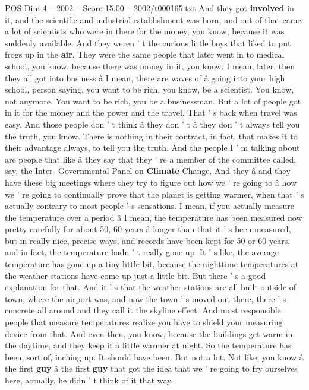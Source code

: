 \begin{textsample}{POS Dim 4 – 2002 – Score 15.00 – 2002/t000165.txt}
And they got \textbf{involved} in it, and the scientific and industrial establishment was born, and out of that came a lot of scientists who were in there for the money, you know, because it was suddenly available.
And they weren ' t the curious little boys that liked to put frogs up in the \textbf{air}.
They were the same people that later went in to medical school, you know, because there was money in it, you know.
I mean, later, then they all got into business â I mean, there are waves of â going into your high school, person saying, you want to be rich, you know, be a scientist.
You know, not anymore.
You want to be rich, you be a businessman.
But a lot of people got in it for the money and the power and the travel.
That ' s back when travel was easy.
And those people don ' t think â they don ' t â they don ' t always tell you the truth, you know.
There is nothing in their contract, in fact, that makes it to their advantage always, to tell you the truth.
And the people I ' m talking about are people that like â they say that they ' re a member of the committee called, say, the Inter- Governmental Panel on \textbf{Climate} Change.
And they â and they have these big meetings where they try to figure out how we ' re going to â how we ' re going to continually prove that the planet is getting warmer, when that ' s actually contrary to most people ' s sensations.
I mean, if you actually measure the temperature over a period â I mean, the temperature has been measured now pretty carefully for about 50, 60 years â longer than that it ' s been measured, but in really nice, precise ways, and records have been kept for 50 or 60 years, and in fact, the temperature hadn ' t really gone up.
It ' s like, the average temperature has gone up a tiny little bit, because the nighttime temperatures at the weather stations have come up just a little bit.
But there ' s a good explanation for that.
And it ' s that the weather stations are all built outside of town, where the airport was, and now the town ' s moved out there, there ' s concrete all around and they call it the skyline effect.
And most responsible people that measure temperatures realize you have to shield your measuring device from that.
And even then, you know, because the buildings get warm in the daytime, and they keep it a little warmer at night.
So the temperature has been, sort of, inching up.
It should have been.
But not a lot.
Not like, you know â the first \textbf{guy} â the first \textbf{guy} that got the idea that we ' re going to fry ourselves here, actually, he didn ' t think of it that way.

\end{textsample}
